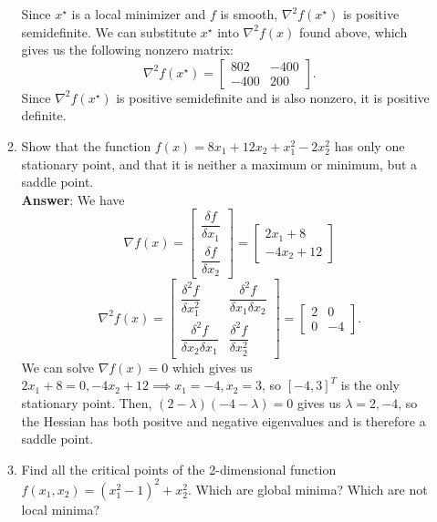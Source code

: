 \documentclass{article}
\begin{document}
\begin{enumerate}
\begin{enumerate}
                    Since $x^\star$ is a local minimizer and $f$ is smooth, $\nabla^2 f(x^\star)$ is positive semidefinite. We can substitute $x^\star$ into $\nabla^2 f(x)$ found above, which gives us the following nonzero matrix: \[\nabla^2 f(x^\star)=\begin{bmatrix}
                            802  & -400 \\
                            -400 & 200
                        \end{bmatrix}.
                    \] Since $\nabla^2 f(x^\star)$ is positive semidefinite and is also nonzero, it is positive definite.
              \item Show that the function $f(x)=8x_1+12x_2+x_1^2-2x_2^2$ has only one stationary point, and that it is neither a maximum or minimum, but a saddle point.\\
                    \textbf{Answer}: We have \[
                        \nabla f(x)=\begin{bmatrix}
                            \dfrac{\delta f}{\delta x_1} \\\dfrac{\delta f}{\delta x_2}
                        \end{bmatrix}=\begin{bmatrix}
                            2x_1+8 \\-4x_2+12
                        \end{bmatrix}
                    \]\[
                        \nabla^2 f(x)=\begin{bmatrix}
                            \dfrac{\delta^2 f}{\delta x_1^2} & \dfrac{\delta^2 f}{\delta x_1\delta x_2} \\\dfrac{\delta^2 f}{\delta x_2\delta x_1}&\dfrac{\delta^2 f}{\delta x_2^2}
                        \end{bmatrix}=\begin{bmatrix}
                            2 & 0  \\
                            0 & -4
                        \end{bmatrix}.
                    \] We can solve $\nabla f(x)=0$ which gives us $2x_1+8=0,-4x_2+12\implies x_1=-4,x_2=3$, so $[-4,3]^T$ is the only stationary point. Then, $(2-\lambda)(-4-\lambda)=0$ gives us $\lambda=2,-4$, so the Hessian has both positve and negative eigenvalues and is therefore a saddle point.
              \item Find all the critical points of the 2-dimensional function $f(x_1,x_2)=(x_1^2-1)^2+x_2^2$. Which are global minima? Which are not local minima?\\

\end{enumerate}
\end{enumerate}
\end{document}
